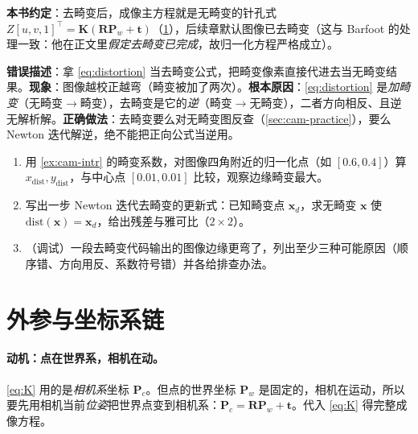\textbf{本书约定}：去畸变后，成像主方程就是无畸变的针孔式 $Z[u,v,1]^\top=\mathbf{K}(\mathbf{R}\mathbf{P}_w+\mathbf{t})$（\cref{sec:cam-chain}），后续章默认图像已去畸变（这与 Barfoot 的处理一致：他在正文里\emph{假定去畸变已完成}，故归一化方程严格成立\cite{barfoot2024state}）。

\begin{pitfall}
\textbf{错误描述}：拿 \cref{eq:distortion} 当去畸变公式，把畸变像素直接代进去当无畸变结果。\textbf{现象}：图像越校正越弯（畸变被加了两次）。\textbf{根本原因}：\cref{eq:distortion} 是\emph{加畸变}（无畸变$\to$畸变），去畸变是它的\emph{逆}（畸变$\to$无畸变），二者方向相反、且逆无解析解。\textbf{正确做法}：去畸变要么对无畸变图反查（\cref{sec:cam-practice}），要么 Newton 迭代解逆，绝不能把正向公式当逆用。
\end{pitfall}

\begin{practice}
\begin{enumerate}
  \item 用 \cref{ex:cam-intr} 的畸变系数，对图像四角附近的归一化点（如 $[0.6,0.4]$）算 $x_{\text{dist}},y_{\text{dist}}$，与中心点 $[0.01,0.01]$ 比较，观察边缘畸变最大。
  \item 写出一步 Newton 迭代去畸变的更新式：已知畸变点 $\mathbf{x}_d$，求无畸变 $\mathbf{x}$ 使 $\text{dist}(\mathbf{x})=\mathbf{x}_d$，给出残差与雅可比（$2\times2$）。
  \item （调试）一段去畸变代码输出的图像边缘更弯了，列出至少三种可能原因（顺序错、方向用反、系数符号错）并各给排查办法。
\end{enumerate}
\end{practice}

\section{外参与坐标系链}
\label{sec:cam-chain}

\paragraph{动机：点在世界系，相机在动。}
\cref{eq:K} 用的是\emph{相机系}坐标 $\mathbf{P}_c$。但点的世界坐标 $\mathbf{P}_w$ 是固定的，相机在运动，所以要先用相机当前\emph{位姿}把世界点变到相机系\cite{gaoxiang2019slam14}：$\mathbf{P}_c=\mathbf{R}\mathbf{P}_w+\mathbf{t}$。代入 \cref{eq:K} 得完整成像方程。

